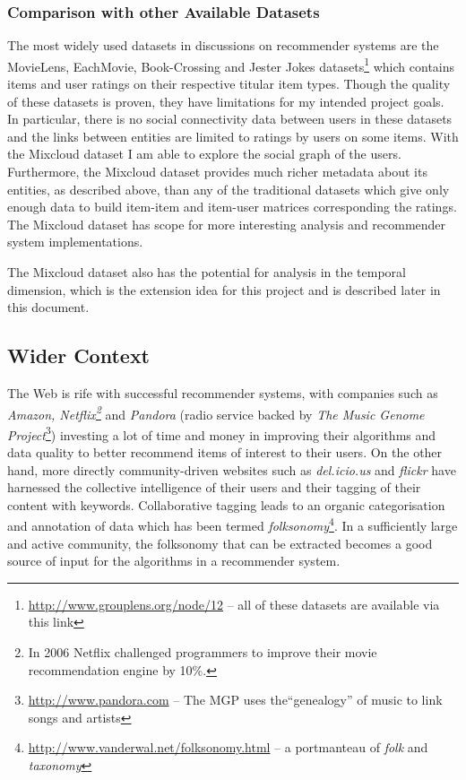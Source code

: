 \subsubsection*{Comparison with other Available Datasets}

The most widely used datasets in discussions on recommender systems are the MovieLens, EachMovie, Book-Crossing and Jester Jokes datasets\footnote{\url{http://www.grouplens.org/node/12} -- all of these datasets are available via this link} which contains items and user ratings on their respective titular item types. Though the quality of these datasets is proven, they have limitations for my intended project goals. In particular, there is no social connectivity data between users in these datasets and the links between entities are limited to ratings by users on some items. With the Mixcloud dataset I am able to explore the social graph of the users. Furthermore, the Mixcloud dataset provides much richer metadata about its entities, as described above, than any of the traditional datasets which give only enough data to build item-item and item-user matrices corresponding the ratings. The Mixcloud dataset has scope for more interesting analysis and recommender system implementations.

The Mixcloud dataset also has the potential for analysis in the temporal dimension, which is the extension idea for this project and is described later in this document.

\subsection*{Wider Context}

The Web is rife with successful recommender systems, with companies such as \textit{Amazon, Netflix\footnote{In 2006 Netflix challenged programmers to improve their movie recommendation engine by 10\%.}} and \textit{Pandora} (radio service backed by \textit{The Music Genome Project}\footnote{\url{http://www.pandora.com} -- The MGP uses the``genealogy'' of music to link songs and artists}) investing a lot of time and money in improving their algorithms and data quality to better recommend items of interest to their users. On the other hand, more directly community-driven websites such as \textit{del.icio.us} and \textit{flickr} have harnessed the collective intelligence of their users and their tagging of their content with keywords. Collaborative tagging leads to an organic categorisation and annotation of data which has been termed \textit{folksonomy}\footnote{\url{http://www.vanderwal.net/folksonomy.html} -- a portmanteau of \textit{folk} and \textit{taxonomy} }. In a sufficiently large and active community, the folksonomy that can be extracted becomes a good source of input for the algorithms in a recommender system. 

